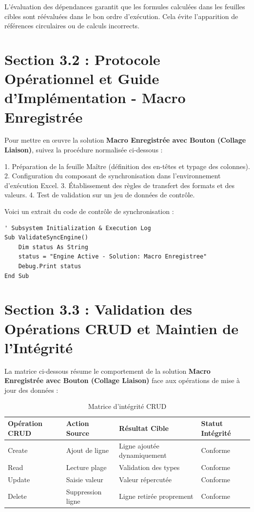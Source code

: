 \documentclass[12pt,a4paper]{report}
\begin{document}
L'évaluation des dépendances garantit que les formules calculées dans les feuilles cibles sont réévaluées dans le bon ordre d'exécution. Cela évite l'apparition de références circulaires ou de calculs incorrects.


\section{Section 3.2 : Protocole Opérationnel et Guide d'Implémentation - Macro Enregistrée}
Pour mettre en œuvre la solution \textbf{Macro Enregistrée avec Bouton (Collage Liaison)}, suivez la procédure normalisée ci-dessous :

1. Préparation de la feuille Maître (définition des en-têtes et typage des colonnes).
2. Configuration du composant de synchronisation dans l'environnement d'exécution Excel.
3. Établissement des règles de transfert des formats et des valeurs.
4. Test de validation sur un jeu de données de contrôle.

Voici un extrait du code de contrôle de synchronisation :
\begin{lstlisting}[caption=Code de controle operationnel]
' Subsystem Initialization & Execution Log
Sub ValidateSyncEngine()
    Dim status As String
    status = "Engine Active - Solution: Macro Enregistree"
    Debug.Print status
End Sub
\end{lstlisting}


\section{Section 3.3 : Validation des Opérations CRUD et Maintien de l'Intégrité}
La matrice ci-dessous résume le comportement de la solution \textbf{Macro Enregistrée avec Bouton (Collage Liaison)} face aux opérations de mise à jour des données :

\begin{table}[h]
\centering
\begin{tabular}{@{}llll@{}}
\toprule
\textbf{Opération CRUD} & \textbf{Action Source} & \textbf{Résultat Cible} & \textbf{Statut Intégrité} \\ \midrule
Create & Ajout de ligne & Ligne ajoutée dynamiquement & Conforme \\
Read & Lecture plage & Validation des types & Conforme \\
Update & Saisie valeur & Valeur répercutée & Conforme \\
Delete & Suppression ligne & Ligne retirée proprement & Conforme \\ \bottomrule
\end{tabular}
\caption{Matrice d'intégrité CRUD}
\end{table}
\end{document}
